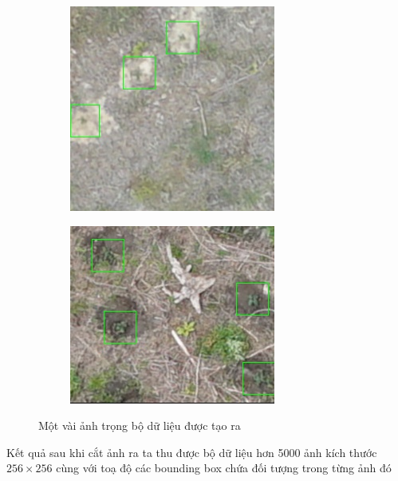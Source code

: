\documentclass[a4paper, 12pt]{report}
\begin{document}
\begin{enumerate}[label= \textit{\alph*)}]
\begin{figure}[!h]
\begin{subfigure}[!h]{0.45\textwidth}
    \includegraphics[width=\linewidth]{Images/original/Img_RSKA003603_0_r256_c3328}
        \label{fig:subfig2}
    \end{subfigure}
 
    \begin{subfigure}[!h]{0.5\textwidth}
    	\includegraphics[width=\linewidth]{Images/original/Img_RSKA014702_3_r1664_c384}
        \label{fig:subfig3}
    \end{subfigure}
    \caption[Optional caption for list of figures]{Một vài ảnh trọng bộ dữ liệu được tạo ra}
\end{figure}
\end{enumerate}
Kết quả sau khi cắt ảnh ra ta thu được bộ dữ liệu hơn 5000 ảnh kích thước $256 \times 256$ cùng với toạ độ các bounding box chứa đối tượng trong từng ảnh đó
\end{document}
